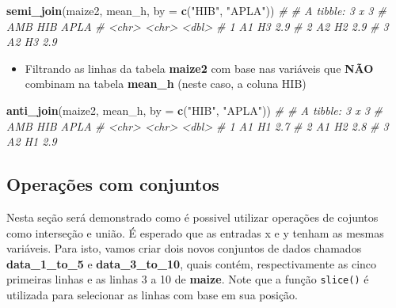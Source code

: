 \documentclass[
]{book}
\newenvironment{Shaded}{\begin{snugshade}}{\end{snugshade}}
\newcommand{\CommentTok}[1]{\textcolor[rgb]{0.56,0.35,0.01}{\textit{#1}}}
\newcommand{\DataTypeTok}[1]{\textcolor[rgb]{0.13,0.29,0.53}{#1}}
\newcommand{\KeywordTok}[1]{\textcolor[rgb]{0.13,0.29,0.53}{\textbf{#1}}}
\newcommand{\NormalTok}[1]{#1}
\newcommand{\StringTok}[1]{\textcolor[rgb]{0.31,0.60,0.02}{#1}}
\providecommand{\tightlist}{%
  \setlength{\itemsep}{0pt}\setlength{\parskip}{0pt}}
\begin{document}
\begin{Shaded}
\begin{Highlighting}[]
\KeywordTok{semi_join}\NormalTok{(maize2, mean_h, }\DataTypeTok{by =} \KeywordTok{c}\NormalTok{(}\StringTok{"HIB"}\NormalTok{, }\StringTok{"APLA"}\NormalTok{))}
\CommentTok{# # A tibble: 3 x 3}
\CommentTok{#   AMB   HIB    APLA}
\CommentTok{#   <chr> <chr> <dbl>}
\CommentTok{# 1 A1    H3      2.9}
\CommentTok{# 2 A2    H2      2.9}
\CommentTok{# 3 A2    H3      2.9}
\end{Highlighting}
\end{Shaded}

\begin{itemize}
\tightlist
\item
  Filtrando as linhas da tabela \textbf{maize2} com base nas variáveis que \textbf{NÃO} combinam na tabela \textbf{mean\_h} (neste caso, a coluna HIB) 
\end{itemize}

\begin{Shaded}
\begin{Highlighting}[]
\KeywordTok{anti_join}\NormalTok{(maize2, mean_h, }\DataTypeTok{by =} \KeywordTok{c}\NormalTok{(}\StringTok{"HIB"}\NormalTok{, }\StringTok{"APLA"}\NormalTok{))}
\CommentTok{# # A tibble: 3 x 3}
\CommentTok{#   AMB   HIB    APLA}
\CommentTok{#   <chr> <chr> <dbl>}
\CommentTok{# 1 A1    H1      2.7}
\CommentTok{# 2 A1    H2      2.8}
\CommentTok{# 3 A2    H1      2.9}
\end{Highlighting}
\end{Shaded}

\hypertarget{operauxe7uxf5es-com-conjuntos}{%
\subsection{Operações com conjuntos}\label{operauxe7uxf5es-com-conjuntos}}

Nesta seção será demonstrado como é possivel utilizar operações de cojuntos como interseção e união. É esperado que as entradas x e y tenham as mesmas variáveis. Para isto, vamos criar dois novos conjuntos de dados chamados \textbf{data\_1\_to\_5} e \textbf{data\_3\_to\_10}, quais contém, respectivamente as cinco primeiras linhas
e as linhas 3 a 10 de \textbf{maize}. Note que a função \texttt{slice()}  é utilizada para selecionar as linhas com base em sua posição.
\end{document}
